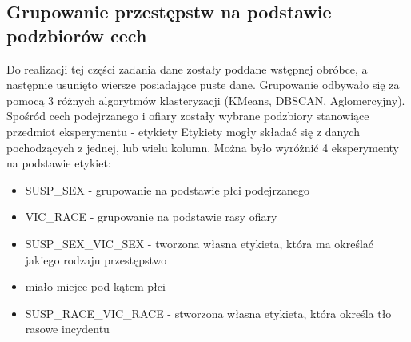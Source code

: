 \documentclass{classrep}
\begin{document}
{        \subsection{Grupowanie przestępstw na podstawie podzbiorów cech} {
            Do realizacji tej części zadania dane zostały poddane wstępnej obróbce, a następnie usunięto wiersze
            posiadające puste dane. Grupowanie odbywało się za pomocą 3 różnych algorytmów klasteryzacji
            (KMeans, DBSCAN, Aglomercyjny).
            Spośród cech podejrzanego i ofiary zostały wybrane podzbiory stanowiące przedmiot eksperymentu - etykiety
            Etykiety mogły składać się z danych pochodzących z jednej, lub wielu kolumn. Można było wyróżnić 4
            eksperymenty na podstawie etykiet:
            \begin{itemize}
                \item SUSP\_SEX - grupowanie na podstawie płci podejrzanego
                \item VIC\_RACE - grupowanie na podstawie rasy ofiary
                \item SUSP\_SEX\_VIC\_SEX - tworzona własna etykieta, która ma określać jakiego rodzaju przestępstwo
                \item miało miejce pod kątem płci
                \item SUSP\_RACE\_VIC\_RACE - stworzona własna etykieta, która określa tło rasowe incydentu
            \end{itemize}

}}
\end{document}
